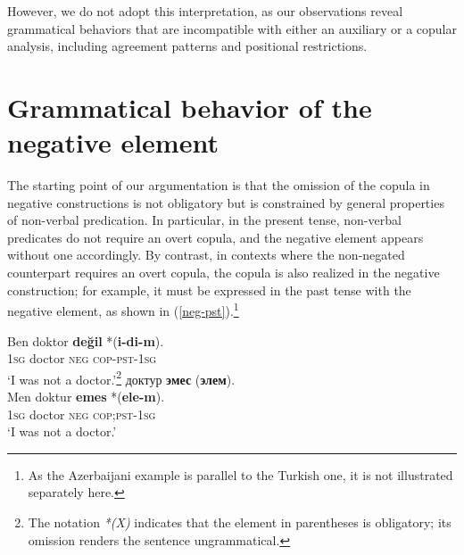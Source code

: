 \documentclass[10pt, a4paper]{article}
\newcommand{\cyr}[1]{{\fontencoding{T2A}\selectfont #1}}
\newcommand{\gl}[1]{\textsc{#1}}
\begin{document}
However, we do not adopt this interpretation, as our observations reveal grammatical behaviors that are incompatible with either an auxiliary or a copular analysis, including agreement patterns and positional restrictions.

\section{Grammatical behavior of the negative element}


The starting point of our argumentation is that the omission of the copula in negative constructions is not obligatory but is constrained by general properties of non-verbal predication. In particular, in the present tense, non-verbal predicates do not require an overt copula, and the negative element appears without one accordingly. By contrast, in contexts where the non-negated counterpart requires an overt copula, the copula is also realized in the negative construction; for example, it must be expressed in the past tense with the negative element, as shown in (\ref{neg-pst}).\footnote{As the Azerbaijani example is parallel to the Turkish one, it is not illustrated separately here.}

\begin{exe}
  \ex\label{neg-pst}
  \begin{xlist}
    \ex\label{neg-pst-tr}
    \gll Ben doktor \textbf{değil} *(\textbf{i-di-m}).\\
    1\gl{sg} doctor \gl{neg} \gl{cop}-\gl{pst}-1\gl{sg}\\
    \glt `I was not a doctor.'\footnote{The notation \emph{*(X)} indicates that the element in parentheses is obligatory; its omission renders the sentence ungrammatical.}
    \ex\label{neg-pst-ky}
    \glll \cyr{Мен} \cyr{доктур} \cyr{\textbf{эмес}} \cyr{*(\textbf{элем})}.\\
    Men doktur \textbf{emes} *(\textbf{ele-m}).\\
    1\gl{sg} doctor \gl{neg} \gl{cop};\gl{pst}-1\gl{sg}\\
    \glt `I was not a doctor.'
  \end{xlist}
\end{exe}
\end{document}
